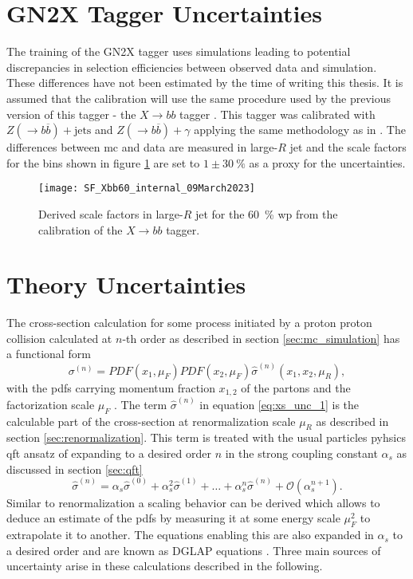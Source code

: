 \section{GN2X Tagger Uncertainties}
The training of the GN2X tagger uses simulations leading to potential discrepancies in selection efficiencies between observed data and simulation. These differences have not been estimated by the time of writing this thesis. It is assumed that the calibration will use the same procedure used by the previous version of this tagger - the $X\rightarrow bb$ tagger \citep{ATL-PHYS-PUB-2020-019}. This tagger was calibrated with $Z(\rightarrow b\overline{b})+\text{jets}$ and $Z(\rightarrow b\overline{b})+\gamma$ applying the same methodology as in \citep{ATL-PHYS-PUB-2021-035}. The differences between \ac{mc} and data are measured in large-$R$ jet \pt and the scale factors for the bins shown in figure \ref{fig:xbb_sf} are set to  $1\pm\qty[]{30}{\percent}$ as a proxy for the uncertainties.
\begin{figure}
    \centering
    \texttt{[image: SF\_Xbb60\_internal\_09March2023]}
    \caption[]{Derived scale factors in large-$R$ jet \pt for the  \qty[]{60}{\percent} \ac{wp} from the calibration of the $X\rightarrow bb$ tagger.}
    \label{fig:xbb_sf}
\end{figure}

\section{Theory Uncertainties}\label{sec:theory_uncertainties}
The cross-section calculation for some process initiated by a proton proton collision calculated at $n$-th order as described in section \ref{sec:mc_simulation} has a functional form
\begin{equation}
    \sigma^{(n)} = PDF(x_1, \mu_F)  PDF(x_2, \mu_F) \hat{\sigma}^{(n)}(x_1,x_2,\mu_R),
    \label{eq:xs_unc_1}
\end{equation}
with the \acfp{pdf} carrying momentum fraction $x_{1,2}$ of the partons and the factorization scale $\mu_F$ \citep{unc_recipe}. The term $\hat{\sigma}^{(n)}$ in equation \ref{eq:xs_unc_1} is the calculable part of the cross-section at renormalization scale $\mu_R$ as described in section \ref{sec:renormalization}. This term is treated with the usual particles pyhsics \ac{qft} ansatz of expanding to a desired order $n$ in the strong coupling constant $\alpha_s$ as discussed in section \ref{sec:qft}
\begin{equation}
    \hat{\sigma}^{(n)} = \alpha_s \hat{\sigma}^{(0)} + \alpha_s^2 \hat{\sigma}^{(1)} + \ldots + \alpha_s^n \hat{\sigma}^{(n)} + \mathcal{O}(\alpha_s^{n+1}).
    \label{eq:xs_unc_2}
\end{equation}
Similar to renormalization a scaling behavior can be derived which allows to deduce an estimate of the \acp{pdf} by measuring it at some energy scale $\mu_F^2$ to extrapolate it to another. The equations enabling this are also expanded in $\alpha_s$ to a desired order and are known as DGLAP equations \citep{halzen1984introductory}. Three main sources of uncertainty arise in these calculations described in the following.


